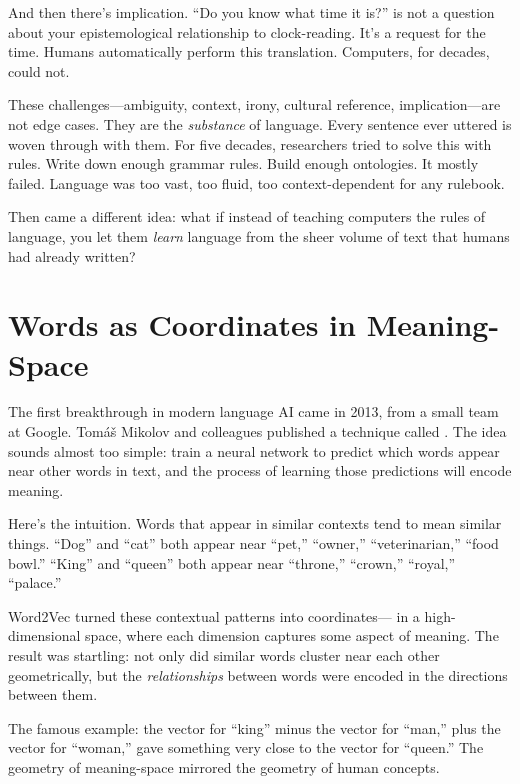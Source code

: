 And then there's implication. ``Do you know what time it is?'' is not a question about your epistemological relationship to clock-reading. It's a request for the time. Humans automatically perform this translation. Computers, for decades, could not.

These challenges---ambiguity, context, irony, cultural reference, implication---are not edge cases. They are the \emph{substance} of language. Every sentence ever uttered is woven through with them. For five decades, researchers tried to solve this with rules. Write down enough grammar rules. Build enough ontologies. It mostly failed. Language was too vast, too fluid, too context-dependent for any rulebook.

Then came a different idea: what if instead of teaching computers the rules of language, you let them \emph{learn} language from the sheer volume of text that humans had already written?

\section{Words as Coordinates in Meaning-Space}
\label{sec:word-embeddings}

The first breakthrough in modern language AI came in 2013, from a small team at Google. Tom\'{a}\v{s} Mikolov and colleagues published a technique called  \autocite{mikolov2013efficient}. The idea sounds almost too simple: train a neural network to predict which words appear near other words in text, and the process of learning those predictions will encode meaning.

Here's the intuition. Words that appear in similar contexts tend to mean similar things. ``Dog'' and ``cat'' both appear near ``pet,'' ``owner,'' ``veterinarian,'' ``food bowl.'' ``King'' and ``queen'' both appear near ``throne,'' ``crown,'' ``royal,'' ``palace.''

Word2Vec turned these contextual patterns into coordinates--- in a high-dimensional space, where each dimension captures some aspect of meaning. The result was startling: not only did similar words cluster near each other geometrically, but the \emph{relationships} between words were encoded in the directions between them.

The famous example: the vector for ``king'' minus the vector for ``man,'' plus the vector for ``woman,'' gave something very close to the vector for ``queen.'' The geometry of meaning-space mirrored the geometry of human concepts.

